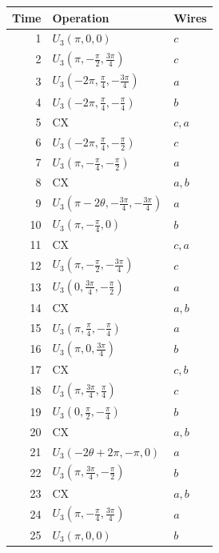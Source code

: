 \begin{center}\small\begin{tabular}{rll}\toprule
Time & Operation & Wires\\\midrule
1 & $U_3(\pi,0,0)$ & $c$\\
2 & $U_3(\pi,- \frac{\pi}{2},\frac{3 \pi}{4})$ & $c$\\
3 & $U_3(- 2 \pi,\frac{\pi}{4},- \frac{3 \pi}{4})$ & $a$\\
4 & $U_3(- 2 \pi,\frac{\pi}{4},- \frac{\pi}{4})$ & $b$\\
5 & $\mathrm{CX}$ & $c,a$\\
6 & $U_3(- 2 \pi,\frac{\pi}{4},- \frac{\pi}{2})$ & $c$\\
7 & $U_3(\pi,- \frac{\pi}{4},- \frac{\pi}{2})$ & $a$\\
8 & $\mathrm{CX}$ & $a,b$\\
9 & $U_3(\pi - 2 \theta,- \frac{3 \pi}{4},- \frac{3 \pi}{4})$ & $a$\\
10 & $U_3(\pi,- \frac{\pi}{4},0)$ & $b$\\
11 & $\mathrm{CX}$ & $c,a$\\
12 & $U_3(\pi,- \frac{\pi}{2},- \frac{3 \pi}{4})$ & $c$\\
13 & $U_3(0,\frac{3 \pi}{4},- \frac{\pi}{2})$ & $a$\\
14 & $\mathrm{CX}$ & $a,b$\\
15 & $U_3(\pi,\frac{\pi}{4},- \frac{\pi}{4})$ & $a$\\
16 & $U_3(\pi,0,\frac{3 \pi}{4})$ & $b$\\
17 & $\mathrm{CX}$ & $c,b$\\
18 & $U_3(\pi,\frac{3 \pi}{4},\frac{\pi}{4})$ & $c$\\
19 & $U_3(0,\frac{\pi}{2},- \frac{\pi}{4})$ & $b$\\
20 & $\mathrm{CX}$ & $a,b$\\
21 & $U_3(- 2 \theta + 2 \pi,- \pi,0)$ & $a$\\
22 & $U_3(\pi,\frac{3 \pi}{4},- \frac{\pi}{2})$ & $b$\\
23 & $\mathrm{CX}$ & $a,b$\\
24 & $U_3(\pi,- \frac{\pi}{4},\frac{3 \pi}{4})$ & $a$\\
25 & $U_3(\pi,0,0)$ & $b$\\
\bottomrule\end{tabular}\end{center}
